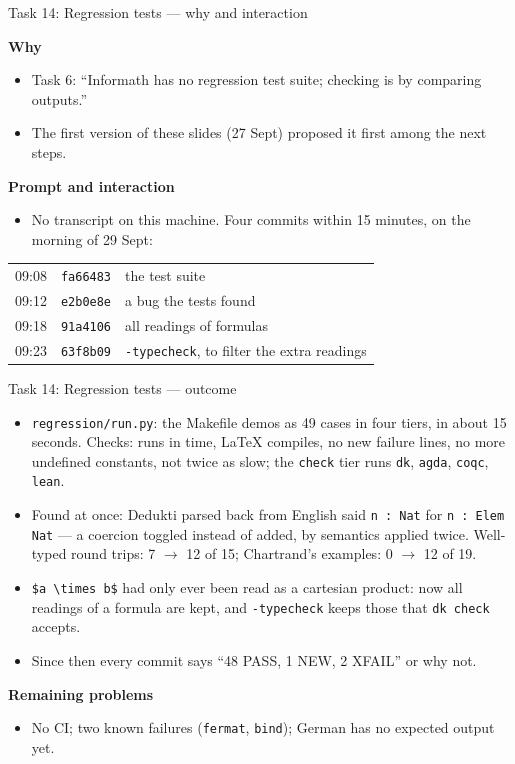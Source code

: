 \documentclass[10pt,aspectratio=169]{beamer}
\newcommand{\bad}[1]{\textcolor{warn}{#1}}
\newcommand{\commit}[1]{\texttt{\footnotesize #1}}
\newcommand{\why}{\par\textcolor{gfblue}{\textbf{Why}}\par}
\newcommand{\how}{\par\textcolor{gfblue}{\textbf{Prompt and interaction}}\par}
\begin{document}
\begin{frame}{Task 14: Regression tests --- why and interaction}
  \why
  \begin{itemize}\small
    \item Task 6: ``Informath has no regression test suite; checking is by
          comparing outputs.''
    \item The first version of these slides (27 Sept) proposed it first among the
          next steps.
  \end{itemize}
  \how
  \begin{itemize}\small
    \item No transcript on this machine. Four commits within 15 minutes, on
          the morning of 29 Sept:
  \end{itemize}
  \begin{center}\footnotesize
  \begin{tabular}{lll}
    \toprule
    09:08 & \commit{fa66483} & the test suite \\
    09:12 & \commit{e2b0e8e} & a bug the tests found \\
    09:18 & \commit{91a4106} & all readings of formulas \\
    09:23 & \commit{63f8b09} & \texttt{-typecheck}, to filter the extra readings \\
    \bottomrule
  \end{tabular}
  \end{center}
\end{frame}

\begin{frame}{Task 14: Regression tests --- outcome}
  \begin{itemize}\small
    \item \texttt{regression/run.py}: the Makefile demos as 49 cases in four tiers,
          in about 15 seconds. Checks: runs in time, LaTeX compiles, no new
          failure lines, no more undefined constants, not twice as slow;
          the \texttt{check} tier runs \texttt{dk}, \texttt{agda}, \texttt{coqc}, \texttt{lean}.
    \item Found at once: Dedukti parsed back from English said \bad{\texttt{n : Nat}}
          for \texttt{n : Elem Nat} --- a coercion toggled instead of added, by
          semantics applied twice. Well-typed round trips: 7 $\to$ 12 of 15;
          Chartrand's examples: 0 $\to$ 12 of 19.
    \item \texttt{\$a \textbackslash times b\$} had only ever been read as a
          cartesian product: now all readings of a formula are kept, and
          \texttt{-typecheck} keeps those that \texttt{dk check} accepts.
    \item Since then every commit says ``48 PASS, 1 NEW, 2 XFAIL'' or why not.
  \end{itemize}
  \textbf{Remaining problems}
  \begin{itemize}\small
    \item No CI; two known failures (\texttt{fermat}, \texttt{bind}); German has
          no expected output yet.
  \end{itemize}
\end{frame}
\end{document}
